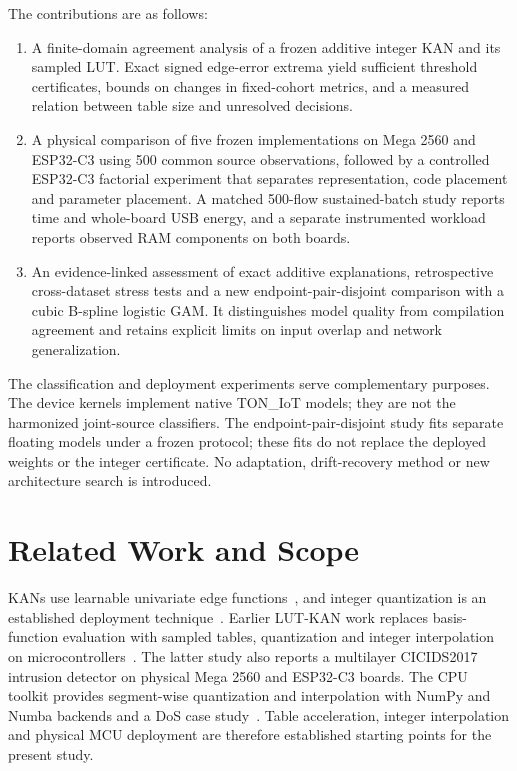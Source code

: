 \documentclass{ieeeaccess}
\begin{document}
The contributions are as follows:
\begin{enumerate}
\item A finite-domain agreement analysis of a frozen additive integer KAN and its sampled LUT. Exact signed edge-error extrema yield sufficient threshold certificates, bounds on changes in fixed-cohort metrics, and a measured relation between table size and unresolved decisions.
\item A physical comparison of five frozen implementations on Mega 2560 and ESP32-C3 using 500 common source observations, followed by a controlled ESP32-C3 factorial experiment that separates representation, code placement and parameter placement. A matched 500-flow sustained-batch study reports time and whole-board USB energy, and a separate instrumented workload reports observed RAM components on both boards.
\item An evidence-linked assessment of exact additive explanations, retrospective cross-dataset stress tests and a new endpoint-pair-disjoint comparison with a cubic B-spline logistic GAM. It distinguishes model quality from compilation agreement and retains explicit limits on input overlap and network generalization.
\end{enumerate}

The classification and deployment experiments serve complementary purposes. The device kernels implement native TON\_IoT models; they are not the harmonized joint-source classifiers. The endpoint-pair-disjoint study fits separate floating models under a frozen protocol; these fits do not replace the deployed weights or the integer certificate. No adaptation, drift-recovery method or new architecture search is introduced.

\section{Related Work and Scope}
KANs use learnable univariate edge functions~\cite{liu2024kan}, and integer quantization is an established deployment technique~\cite{jacob2018integer}. Earlier LUT-KAN work replaces basis-function evaluation with sampled tables, quantization and integer interpolation on microcontrollers~\cite{kuznetsov2026esl,kuznetsov2026mculut}. The latter study also reports a multilayer CICIDS2017 intrusion detector on physical Mega 2560 and ESP32-C3 boards. The CPU toolkit provides segment-wise quantization and interpolation with NumPy and Numba backends and a DoS case study~\cite{kuznetsov2026toolkit}. Table acceleration, integer interpolation and physical MCU deployment are therefore established starting points for the present study.
\end{document}
